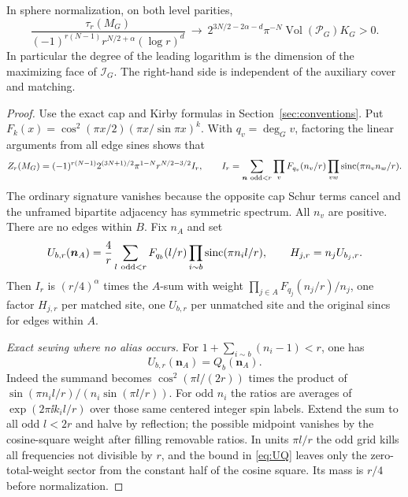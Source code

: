 \begin{theorem}\label{thm:trees}
In sphere normalization, on both level parities,
\[
 \frac{\tau_r(M_G)}
 {(-1)^{r(N-1)}r^{N/2+\alpha}(\log r)^d}
  \ \longrightarrow\
  2^{3N/2-2\alpha-d}\pi^{-N}\operatorname{Vol}(\mathcal P_G)K_G>0.
\]
In particular the degree of the leading logarithm is the dimension of the maximizing face of \(\mathcal I_G\). The right-hand side is independent of the auxiliary cover and matching.
\end{theorem}
\begin{proof}
Use the exact cap and Kirby formulas in Section~\ref{sec:conventions}. Put
\(F_k(x)=\cos^2(\pi x/2)(\pi x/\sin\pi x)^k\).
With \(q_v=\deg_G v\), factoring the linear arguments from all edge sines shows that
\[
 Z_r(M_G)=(-1)^{r(N-1)}2^{(3N+1)/2}\pi^{1-N}
             r^{N/2-3/2} I_r,\qquad
 I_r=\sum_{\boldsymbol n\ {\rm odd}<r}
           \prod_v F_{q_v}(n_v/r)
           \prod_{vw}\operatorname{sinc}(\pi n_v n_w/r).
\]
The ordinary signature vanishes because the opposite cap Schur terms cancel and the unframed bipartite adjacency has symmetric spectrum. All \(n_v\) are positive. There are no edges within \(B\). Fix \(n_A\) and set
\[
 U_{b,r}(\boldsymbol n_A)=\frac4r
         \sum_{l\ {\rm odd}<r} F_{q_b}(l/r)
                    \prod_{i\sim b}\operatorname{sinc}(\pi n_i l/r),\qquad
 H_{j,r}=n_j U_{b_j,r}.
\]
Then \(I_r\) is \((r/4)^\alpha\) times the \(A\)-sum with weight \(\prod_{j\in A}F_{q_j}(n_j/r)/n_j\), one factor \(H_{j,r}\) per matched site, one \(U_{b,r}\) per unmatched site and the original sincs for edges within \(A\).

\emph{Exact sewing where no alias occurs.}
For \(1+\sum_{i\sim b}(n_i-1)<r\), one has
\begin{equation}\label{eq:UQ}
                       U_{b,r}(\boldsymbol n_A)=Q_b(\boldsymbol n_A).
\end{equation}
Indeed the summand becomes \(\cos^2(\pi l/(2r))\) times the product of
\(\sin(\pi n_i l/r)/(n_i\sin(\pi l/r))\).
For odd \(n_i\) the ratios are averages of \(\exp(2\pi\ii k_i l/r)\) over those same centered integer spin labels. Extend the sum to all odd \(l<2r\) and halve by reflection; the possible midpoint vanishes by the cosine-square weight after filling removable ratios. In units \(\pi l/r\) the odd grid kills all frequencies not divisible by \(r\), and the bound in \eqref{eq:UQ} leaves only the zero-total-weight sector from the constant half of the cosine square. Its mass is \(r/4\) before normalization.


\end{proof}
